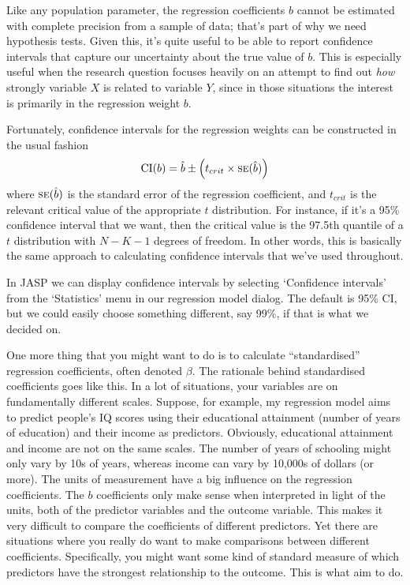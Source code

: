 
Like any population parameter, the regression coefficients $b$ cannot be estimated with complete precision from a sample of data; that's part of why we need hypothesis tests. Given this, it's quite useful to be able to report confidence intervals that capture our uncertainty about the true value of $b$. This is especially useful when the research question focuses heavily on an attempt to find out {\it how} strongly variable $X$ is related to variable $Y$, since in those situations the interest is primarily in the regression weight $b$. 

\vspace{0.5cm}
\begin{mdframed}[style=MyFrame,nobreak=false]
Fortunately, confidence intervals for the regression weights can be constructed in the usual fashion
$$
\mbox{CI}(b) = \hat{b} \pm \left( t_{crit} \times \mbox{\textsc{se}}(\hat{b})  \right)
$$
where $\mbox{\textsc{se}}(\hat{b})$ is the standard error of the regression coefficient, and $t_{crit}$ is the relevant critical value of the appropriate $t$ distribution. For instance, if it's a 95\% confidence interval that we want, then the critical value is the 97.5th quantile of a $t$ distribution with $N-K-1$ degrees of freedom.  In other words, this is basically the same approach to calculating confidence intervals that we've used throughout. 
\end{mdframed}

In JASP we can display confidence intervals by selecting `Confidence intervals' from the `Statistics' menu in our regression model dialog.  The default is 95\% CI, but we could easily choose something different, say 99\%, if that is what we decided on. 



One more thing that you might want to do is to calculate ``standardised'' regression coefficients, often denoted $\beta$. The rationale behind standardised coefficients goes like this. In a lot of situations, your variables are on fundamentally different scales. Suppose, for example, my regression model aims to predict people's IQ scores using their educational attainment (number of years of education) and their income as predictors. Obviously, educational attainment and income are not on the same scales. The number of years of schooling might only vary by 10s of years, whereas income can vary by 10,000s of dollars (or more). The units of measurement have a big influence on the regression coefficients. The $b$ coefficients only make sense when interpreted in light of the units, both of the predictor variables and the outcome variable. This makes it very difficult to compare the coefficients of different predictors. Yet there are situations where you really do want to make comparisons between different coefficients. Specifically, you might want some kind of standard measure of which predictors have the strongest relationship to the outcome. This is what  aim to do. 

